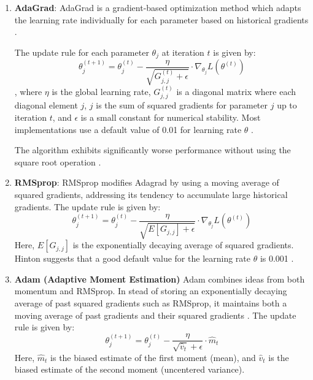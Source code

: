 \documentclass[12pt,a4paper]{article}
\begin{document}
\begin{enumerate}
	\item \textbf{AdaGrad}: AdaGrad is a gradient-based optimization method which adapts the learning rate individually for each parameter based on historical gradients \cite{optimization}.
	
	The update rule for each parameter $\theta_j$ at iteration $t$ is given by:
	\begin{equation}
		\theta_j^{(t+1)} = \theta_j^{(t)} - \frac{\eta}{\sqrt{G_{j,j}^{(t)} + \epsilon}} \cdot \nabla_{\theta_j} L(\theta^{(t)})
	\end{equation}
	, where $\eta$ is the global learning rate, $G_{j,j}^{(t)}$ is a diagonal matrix where each diagonal element $j$, $j$ is
 the sum of squared gradients for parameter $j$ up to iteration $t$, and $\epsilon$ is a small constant for numerical stability.  Most implementations use a default value of
 0.01 for learning rate $\theta$ \cite{optimization}.
 
 The algorithm exhibits significantly worse performance without using the square root operation \cite{GD}.
	
	\item \textbf{RMSprop}: RMSprop modifies Adagrad by using a moving average of squared gradients, addressing its tendency to accumulate large historical gradients. The update rule is given by:
	\begin{equation}
		\theta_j^{(t+1)} = \theta_j^{(t)} - \frac{\eta}{\sqrt{E[G_{j,j}] + \epsilon}} \cdot \nabla_{\theta_j} L(\theta^{(t)})
	\end{equation}
	Here, $E[G_{j,j}]$ is the exponentially decaying average of squared gradients. Hinton suggests that a good default value for the learning rate $\theta$ is 0.001 \cite{GD}.
	
	\item \textbf{Adam (Adaptive Moment Estimation)} Adam combines ideas from both momentum and RMSprop. In stead of storing an exponentially decaying average of past squared gradients such as RMSprop, it maintains both a moving average of past gradients and their squared gradients \cite{GD}. The update rule is given by:
	\begin{equation}
		\theta_j^{(t+1)} = \theta_j^{(t)} - \dfrac{\eta}{\sqrt{\hat{v}_t} + \epsilon} \cdot \hat{m}_t
	\end{equation}
	Here, $\hat{m}_t$ is the biased estimate of the first moment (mean), and $\hat{v}_t$ is the biased estimate of the second moment (uncentered variance).
\end{enumerate}
\end{document}
